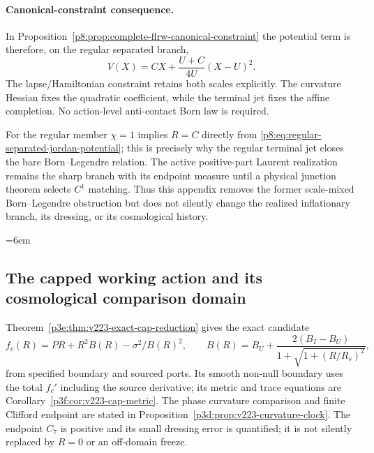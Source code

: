 \documentclass[12pt,a4paper]{article}
\begin{document}
\paragraph{Canonical-constraint consequence.}
In Proposition~\ref{p8:prop:complete-flrw-canonical-constraint} the potential
term is therefore, on the regular separated branch,
\[
 \boxed{
 V(X)=CX+\frac{U+C}{4U}(X-U)^2.}
\]
The lapse/Hamiltonian constraint retains both scales explicitly.  The
curvature Hessian fixes the quadratic coefficient, while the terminal jet
fixes the affine completion.  No action-level anti-contact Born law is
required.

\begin{remark}
\label{p8:rem:bare-legendre-terminal-not-active-freeze}
For the regular member \(\chi=1\) implies \(R=C\) directly from
\eqref{p8:eq:regular-separated-jordan-potential}; this is precisely why the
regular terminal jet closes the bare Born--Legendre relation.  The active
positive-part Laurent realization remains the sharp branch with its endpoint
measure until a physical junction theorem selects \(C^1\) matching.  Thus
this appendix removes the former scale-mixed Born--Legendre obstruction but
does not silently change the realized inflationary branch, its dressing, or
its cosmological history.
\end{remark}

\begingroup
\small
\RaggedRight
{}
\emergencystretch=6em
\subsection{The capped working action and its cosmological comparison domain}
\label{p8:sec:v223-cap-candidate}
Theorem~\ref{p3e:thm:v223-exact-cap-reduction} gives the exact candidate
\[
 f_c(R)=PR+R^2B(R)-\sigma^2/B(R)^2,\qquad
 B(R)=B_U+\frac{2(B_I-B_U)}{1+\sqrt{1+(R/R_s)^2}},
\]
from specified boundary and sourced ports.  Its smooth non-null boundary
uses the total $f_c'$ including the source derivative; its metric and
trace equations are Corollary~\ref{p3f:cor:v223-cap-metric}.  The phase
curvature comparison and finite Clifford endpoint are stated in
Proposition~\ref{p3d:prop:v223-curvature-clock}.  The endpoint $C_7$ is
positive and its small dressing error is quantified; it is not silently
replaced by $R=0$ or an off-domain freeze.
\end{document}
